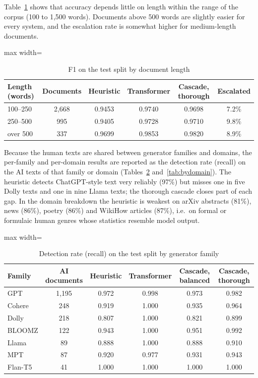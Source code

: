 Table~\ref{tab:bylength} shows that accuracy depends little on length within the
range of the corpus (100 to 1,500 words). Documents above 500 words are
slightly easier for every system, and the escalation rate is somewhat higher
for medium-length documents.

\begin{table}[H]
\caption{F1 on the test split by document length}
\label{tab:bylength}
\centering
\small
\begin{adjustbox}{max width=\textwidth}\begin{tabular}{|l|c|c|c|c|c|}
\hline
\textbf{Length (words)} & \textbf{Documents} & \textbf{Heuristic} & \textbf{Transformer} & \textbf{Cascade, thorough} & \textbf{Escalated} \\ \hline
100--250 & 2,668 & 0.9453 & 0.9740 & 0.9698 & 7.2\% \\ \hline
250--500 & 995 & 0.9405 & 0.9728 & 0.9710 & 9.8\% \\ \hline
over 500 & 337 & 0.9699 & 0.9853 & 0.9820 & 8.9\% \\ \hline
\end{tabular}\end{adjustbox}
\end{table}

Because the human texts are shared between generator families and domains,
the per-family and per-domain results are reported as the detection rate
(recall) on the AI texts of that family or domain
(Tables~\ref{tab:byfamily} and~\ref{tab:bydomain}). The heuristic detects
ChatGPT-style text very reliably (97\%) but misses one in five Dolly texts
and one in nine Llama texts; the thorough cascade closes part of each gap. In
the domain breakdown the heuristic is weakest on arXiv abstracts (81\%),
news (86\%), poetry (86\%) and WikiHow articles (87\%), i.e.\ on formal or
formulaic human genres whose statistics resemble model output.

\begin{table}[H]
\caption{Detection rate (recall) on the test split by generator family}
\label{tab:byfamily}
\centering
\small
\begin{adjustbox}{max width=\textwidth}\begin{tabular}{|l|c|c|c|c|c|}
\hline
\textbf{Family} & \textbf{AI documents} & \textbf{Heuristic} & \textbf{Transformer} & \textbf{Cascade, balanced} & \textbf{Cascade, thorough} \\ \hline
GPT & 1,195 & 0.972 & 0.998 & 0.973 & 0.982 \\ \hline
Cohere & 248 & 0.919 & 1.000 & 0.935 & 0.964 \\ \hline
Dolly & 218 & 0.807 & 1.000 & 0.821 & 0.899 \\ \hline
BLOOMZ & 122 & 0.943 & 1.000 & 0.951 & 0.992 \\ \hline
Llama & 89 & 0.888 & 1.000 & 0.888 & 0.910 \\ \hline
MPT & 87 & 0.920 & 0.977 & 0.931 & 0.943 \\ \hline
Flan-T5 & 41 & 1.000 & 1.000 & 1.000 & 1.000 \\ \hline
\end{tabular}\end{adjustbox}
\end{table}

